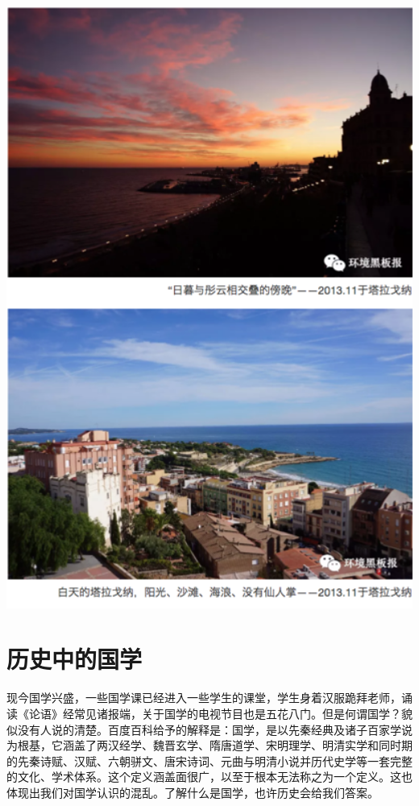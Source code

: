 \documentclass[]{book}
\begin{document}
\includegraphics[width=5.62in]{images/xt40}

\section{历史中的国学}

现今国学兴盛，一些国学课已经进入一些学生的课堂，学生身着汉服跪拜老师，诵读《论语》经常见诸报端，关于国学的电视节目也是五花八门。但是何谓国学？貌似没有人说的清楚。百度百科给予的解释是：国学，是以先秦经典及诸子百家学说为根基，它涵盖了两汉经学、魏晋玄学、隋唐道学、宋明理学、明清实学和同时期的先秦诗赋、汉赋、六朝骈文、唐宋诗词、元曲与明清小说并历代史学等一套完整的文化、学术体系。这个定义涵盖面很广，以至于根本无法称之为一个定义。这也体现出我们对国学认识的混乱。了解什么是国学，也许历史会给我们答案。
\end{document}
